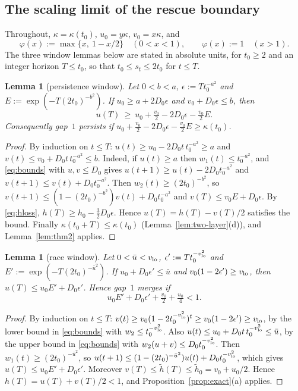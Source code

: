 \documentclass[11pt]{article}
\newtheorem{lemma}[theorem]{Lemma}
\theoremstyle{definition}
\theoremstyle{remark}
\begin{document}
\subsection{The scaling limit of the rescue boundary}

Throughout, $\kappa=\kappa(t_0)$, $u_0=y\kappa$, $v_0=x\kappa$, and
\[
\varphi(x):=\max\{x,\ 1-x/2\}\quad(0<x<1),\qquad\varphi(x):=1\quad(x>1).
\]
The three window lemmas below are stated in absolute units, for $t_0\ge2$ and an integer horizon
$T\le t_0$, so that $t_0\le s_t\le2t_0$ for $t\le T$.

\begin{lemma}[persistence window]\label{lem:winP}
Let $0<b<a$, $\epsilon:=Tt_0^{-a^2}$ and $E:=\exp(-T(2t_0)^{-b^2})$. If $u_0\ge a+2D_0\epsilon$ and
$v_0+D_0\epsilon\le b$, then
\[
u(T)\ \ge\ u_0+\tfrac{v_0}2-2D_0\epsilon-\tfrac{v_0}2E .
\]
Consequently gap~$1$ persists if $u_0+\frac{v_0}2-2D_0\epsilon-\frac{v_0}2E\ge\kappa(t_0)$.
\end{lemma}
\begin{proof}
By induction on $t\le T$: $u(t)\ge u_0-2D_0t\,t_0^{-a^2}\ge a$ and $v(t)\le v_0+D_0t\,t_0^{-a^2}\le b$. Indeed, if
$u(t)\ge a$ then $w_1(t)\le t_0^{-a^2}$, and \eqref{eq:bounds} with $u,v\le D_0$ gives
$u(t+1)\ge u(t)-2D_0t_0^{-a^2}$ and $v(t+1)\le v(t)+D_0t_0^{-a^2}$. Then $w_2(t)\ge(2t_0)^{-b^2}$, so
$v(t+1)\le(1-(2t_0)^{-b^2})v(t)+D_0t_0^{-a^2}$ and $v(T)\le v_0E+D_0\epsilon$. By \eqref{eq:hloss},
$h(T)\ge h_0-\frac32D_0\epsilon$. Hence $u(T)=h(T)-v(T)/2$ satisfies the bound. Finally
$\kappa(t_0+T)\le\kappa(t_0)$ (Lemma~\ref{lem:two-layer}(d)), and Lemma~\ref{lem:thm2} applies.
\end{proof}

\begin{lemma}[race window]\label{lem:winR}
Let $0<\bar u<v_{\rm lo}$, $\epsilon':=Tt_0^{-v_{\rm lo}^2}$ and $E':=\exp(-T(2t_0)^{-\bar u^2})$. If
$u_0+D_0\epsilon'\le\bar u$ and $v_0(1-2\epsilon')\ge v_{\rm lo}$, then $u(T)\le u_0E'+D_0\epsilon'$. Hence gap~$1$ merges if
\[
u_0E'+D_0\epsilon'+\tfrac{v_0}2+\tfrac{u_0}4<1 .
\]
\end{lemma}
\begin{proof}
By induction on $t\le T$: $v(t)\ge v_0(1-2t_0^{-v_{\rm lo}^2})^t\ge v_0(1-2\epsilon')\ge v_{\rm lo}$, by the lower bound in
\eqref{eq:bounds} with $w_2\le t_0^{-v_{\rm lo}^2}$. Also $u(t)\le u_0+D_0t\,t_0^{-v_{\rm lo}^2}\le\bar u$, by the
upper bound in \eqref{eq:bounds} with $w_2(u+v)\le D_0t_0^{-v_{\rm lo}^2}$. Then $w_1(t)\ge(2t_0)^{-\bar u^2}$, so
$u(t+1)\le(1-(2t_0)^{-\bar u^2})u(t)+D_0t_0^{-v_{\rm lo}^2}$, which gives $u(T)\le u_0E'+D_0\epsilon'$. Moreover
$v(T)\le\tilde h(T)\le\tilde h_0=v_0+u_0/2$. Hence $h(T)=u(T)+v(T)/2<1$, and Proposition~\ref{prop:exact}(a) applies.
\end{proof}
\end{document}
